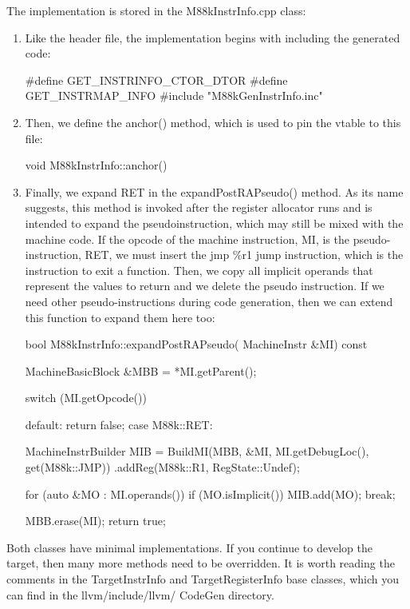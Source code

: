 The implementation is stored in the M88kInstrInfo.cpp class:

\begin{enumerate}
\item
Like the header file, the implementation begins with including the generated code:

\begin{cpp}
#define GET_INSTRINFO_CTOR_DTOR
#define GET_INSTRMAP_INFO
#include "M88kGenInstrInfo.inc"
\end{cpp}

\item
Then, we define the anchor() method, which is used to pin the vtable to this file:

\begin{cpp}
void M88kInstrInfo::anchor() {}
\end{cpp}

\item
Finally, we expand RET in the expandPostRAPseudo() method. As its name suggests, this method is invoked after the register allocator runs and is intended to expand the pseudoinstruction, which may still be mixed with the machine code. If the opcode of the machine instruction, MI, is the pseudo-instruction, RET, we must insert the jmp \%r1 jump instruction, which is the instruction to exit a function. Then, we copy all implicit operands that represent the values to return and we delete the pseudo instruction. If we need other pseudo-instructions during code generation, then we can extend this function to expand them here too:

\begin{cpp}
bool M88kInstrInfo::expandPostRAPseudo(
        MachineInstr &MI) const {
    MachineBasicBlock &MBB = *MI.getParent();

    switch (MI.getOpcode()) {
        default:
            return false;
        case M88k::RET: {
            MachineInstrBuilder MIB =
            BuildMI(MBB, &MI, MI.getDebugLoc(),
                    get(M88k::JMP))
                .addReg(M88k::R1, RegState::Undef);

            for (auto &MO : MI.operands()) {
                if (MO.isImplicit())
                    MIB.add(MO);
            }
            break;
    }
    }
    MBB.erase(MI);
    return true;
}
\end{cpp}

\end{enumerate}

Both classes have minimal implementations. If you continue to develop the target, then many more methods need to be overridden. It is worth reading the comments in the TargetInstrInfo and TargetRegisterInfo base classes, which you can find in the llvm/include/llvm/ CodeGen directory.

